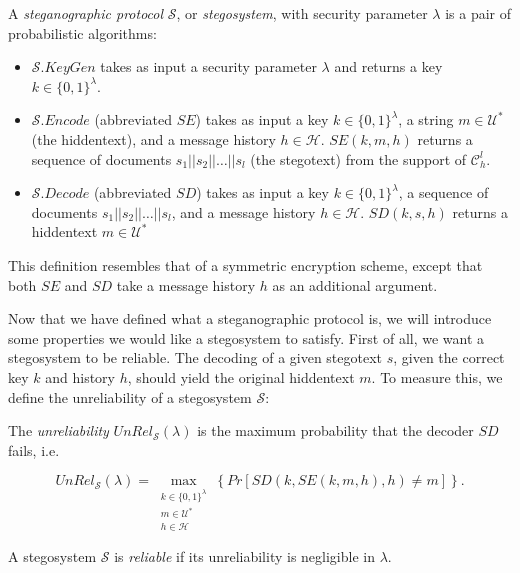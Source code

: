 \begin{definition}
\label{def:stegosystem}
A \emph{steganographic protocol} $\mathcal{S}$, or \emph{stegosystem}, with security parameter $\lambda$ is a pair of probabilistic algorithms:

\begin{itemize}
  \item $\mathcal{S}.KeyGen$ takes as input a security parameter $\lambda$ and returns a key $k \in \{0,1\}^\lambda$.
  \item $\mathcal{S}.Encode$ (abbreviated $SE$) takes as input a key $k \in \{0,1\}^\lambda$, a string $m \in \mathcal{U}^*$ (the hiddentext), and a message history $h \in \mathcal{H}$.
    $SE(k, m, h)$ returns a sequence of documents $s_1||s_2||\dots||s_l$ (the stegotext) from the support of $\mathcal{C}_h^l$.
  \item $\mathcal{S}.Decode$ (abbreviated $SD$) takes as input a key $k \in \{0,1\}^\lambda$, a sequence of documents $s_1||s_2||\dots||s_l$, and a message history $h \in \mathcal{H}$.
    $SD(k, s, h)$ returns a hiddentext $m \in \mathcal{U}^*$
\end{itemize}
\end{definition}

This definition resembles that of a symmetric encryption scheme, except that both $SE$ and $SD$ take a message history $h$ as an additional argument.

Now that we have defined what a steganographic protocol is, we will introduce some properties we would like a stegosystem to satisfy.
First of all, we want a stegosystem to be reliable.
The decoding of a given stegotext $s$, given the correct key $k$ and history $h$, should yield the original hiddentext $m$.
To measure this, we define the unreliability of a stegosystem $\mathcal{S}$:

\begin{definition}
\label{def:unreliability}
The \emph{unreliability} $UnRel_{\mathcal{S}}(\lambda)$ is the maximum probability that the decoder $SD$ fails, i.e.	

$$UnRel_{\mathcal{S}}(\lambda) = \max_{\substack{k \in \{0,1\}^\lambda\\m \in \mathcal{U}^*\\ h \in \mathcal{H}}}\left\{ Pr[SD(k, SE(k,m,h), h) \neq m] \right\}.$$
\end{definition}

\begin{definition}[Reliability]
\label{def:reliability}
A stegosystem $\mathcal{S}$ is \emph{reliable} if its unreliability is negligible in $\lambda$.
\end{definition}

